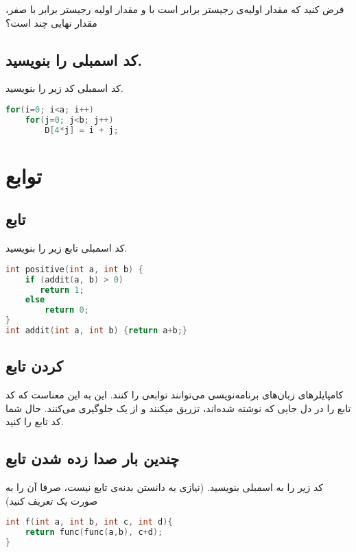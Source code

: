 \documentclass[11pt, dvipsnames, svgnames, x11names]{article}
\begin{document}
فرض کنید که مقدار اولیه‌ی رجیستر
برابر است با 
و مقدار اولیه رجیستر  برابر با صفر، مقدار نهایی 
چند است؟
\subsection{کد اسمبلی را بنویسید.}
کد اسمبلی کد زیر را بنویسید.
\begin{latin}
\begin{lstlisting}[language=c]
for(i=0; i<a; i++)
    for(j=0; j<b; j++)
        D[4*j] = i + j;
\end{lstlisting}
\end{latin}

\section{توابع}
\subsection{تابع }
کد اسمبلی تابع زیر را بنویسید.
\begin{latin}
\begin{lstlisting}[language=c]
int positive(int a, int b) {
    if (addit(a, b) > 0)
       return 1;
    else
        return 0;
}
int addit(int a, int b) {return a+b;}
\end{lstlisting}
\end{latin}

\subsection{ کردن تابع}
کامپایلر‌های زبان‌های برنامه‌نویسی می‌توانند توابعی را  کنند. این به این معناست که کد تابع را در دل جایی که نوشته شده‌اند، تزریق میکنند و از یک 
جلوگیری می‌کنند.
حال شما کد تابع  را 
کنید.
\subsection{چندین‌ بار صدا زده شدن تابع}
کد زیر را به اسمبلی بنویسید. (نیازی به دانستن بدنه‌ی تابع  نیست، صرفا آن را به صورت یک  تعریف کنید)
\begin{latin}
\begin{lstlisting}[language=c]
int f(int a, int b, int c, int d){
    return func(func(a,b), c+d);
}
\end{lstlisting}
\end{latin}
\end{document}
